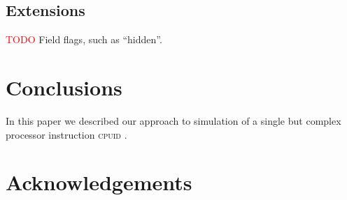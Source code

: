 \documentclass[a4paper,10pt,oneside,unicode]{article}
\newcommand{\cpuid}{\textsc{cpuid} }
\newcommand{\todo}[1][]{\textcolor{red}{TODO #1}}
\begin{document}
\subsection{Extensions}

\todo Field flags, such as “hidden”.

\section{Conclusions}

In this paper we described our approach to simulation of a single but complex processor instruction \cpuid. 

\section{Acknowledgements}


\end{document}
